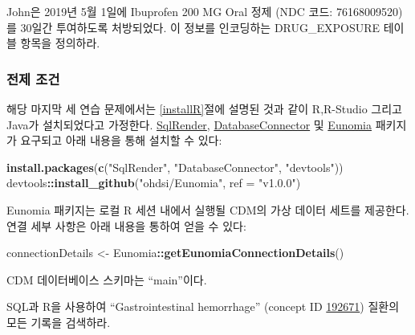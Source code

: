 \documentclass[10.5pt]{book}
\newenvironment{Shaded}{\begin{snugshade}}{\end{snugshade}}
\newcommand{\KeywordTok}[1]{\textcolor[rgb]{0.13,0.29,0.53}{\textbf{#1}}}
\newcommand{\DataTypeTok}[1]{\textcolor[rgb]{0.13,0.29,0.53}{#1}}
\newcommand{\StringTok}[1]{\textcolor[rgb]{0.31,0.60,0.02}{#1}}
\newcommand{\OperatorTok}[1]{\textcolor[rgb]{0.81,0.36,0.00}{\textbf{#1}}}
\newcommand{\NormalTok}[1]{#1}
\theoremstyle{definition}
\theoremstyle{definition}
\theoremstyle{definition}
\theoremstyle{remark}
\let\BeginKnitrBlock\begin \let\EndKnitrBlock\end
\begin{document}
\BeginKnitrBlock{exercise}
\protect\hypertarget{exr:exerciseJohnDrug}{}{\label{exr:exerciseJohnDrug}
}John은 2019년 5월 1일에 Ibuprofen 200 MG Oral 정제 (NDC 코드:
76168009520)를 30일간 투여하도록 처방되었다. 이 정보를 인코딩하는
DRUG\_EXPOSURE 테이블 항목을 정의하라.
\EndKnitrBlock{exercise}

\subsubsection*{전제 조건}\label{--1}

해당 마지막 세 연습 문제에서는 \ref{installR}절에 설명된 것과 같이
R,R-Studio 그리고 Java가 설치되었다고 가정한다.
\href{https://ohdsi.github.io/SqlRender/}{SqlRender},
\href{https://ohdsi.github.io/DatabaseConnector/}{DatabaseConnector} 및
\href{https://ohdsi.github.io/Eunomia/}{Eunomia} 패키지가 요구되고 아래
내용을 통해 설치할 수 있다:

\begin{Shaded}
\begin{Highlighting}[]
\KeywordTok{install.packages}\NormalTok{(}\KeywordTok{c}\NormalTok{(}\StringTok{"SqlRender"}\NormalTok{, }\StringTok{"DatabaseConnector"}\NormalTok{, }\StringTok{"devtools"}\NormalTok{))}
\NormalTok{devtools}\OperatorTok{::}\KeywordTok{install_github}\NormalTok{(}\StringTok{"ohdsi/Eunomia"}\NormalTok{, }\DataTypeTok{ref =} \StringTok{"v1.0.0"}\NormalTok{)}
\end{Highlighting}
\end{Shaded}

Eunomia 패키지는 로컬 R 세션 내에서 실행될 CDM의 가상 데이터 세트를
제공한다. 연결 세부 사항은 아래 내용을 통하여 얻을 수 있다:

\begin{Shaded}
\begin{Highlighting}[]
\NormalTok{connectionDetails <-}\StringTok{ }\NormalTok{Eunomia}\OperatorTok{::}\KeywordTok{getEunomiaConnectionDetails}\NormalTok{()}
\end{Highlighting}
\end{Shaded}

CDM 데이터베이스 스키마는 ``main''이다.

\BeginKnitrBlock{exercise}
\protect\hypertarget{exr:exerciseGiBleedRecords}{}{\label{exr:exerciseGiBleedRecords}
}SQL과 R을 사용하여 ``Gastrointestinal hemorrhage'' (concept ID
\href{http://athena.ohdsi.org/search-terms/terms/192671}{192671}) 질환의
모든 기록을 검색하라.
\EndKnitrBlock{exercise}
\end{document}

